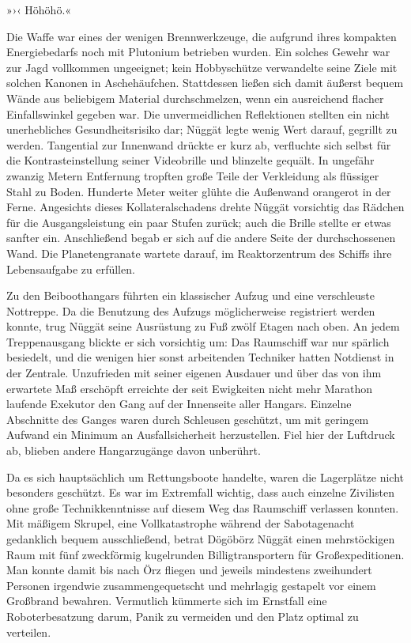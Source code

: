 »›‹ Höhöhö.«

Die Waffe war eines der wenigen Brennwerkzeuge, die aufgrund ihres kompakten Energiebedarfs noch mit Plutonium betrieben wurden. Ein solches Gewehr war zur Jagd vollkommen ungeeignet; kein Hobbyschütze verwandelte seine Ziele mit solchen Kanonen in Aschehäufchen. Stattdessen ließen sich damit äußerst bequem Wände aus beliebigem Material durchschmelzen, wenn ein ausreichend flacher Einfallswinkel gegeben war. Die unvermeidlichen Reflektionen stellten ein nicht unerhebliches Gesundheitsrisiko dar; Nüggät legte wenig Wert darauf, gegrillt zu werden. Tangential zur Innenwand drückte er kurz ab, verfluchte sich selbst für die Kontrasteinstellung seiner Videobrille und blinzelte gequält. In ungefähr zwanzig Metern Entfernung tropften große Teile der Verkleidung als flüssiger Stahl zu Boden. Hunderte Meter weiter glühte die Außenwand orangerot in der Ferne. Angesichts dieses Kollateralschadens drehte Nüggät vorsichtig das Rädchen für die Ausgangsleistung ein paar Stufen zurück; auch die Brille stellte er etwas sanfter ein. Anschließend begab er sich auf die andere Seite der durchschossenen Wand. Die Planetengranate wartete darauf, im Reaktorzentrum des Schiffs ihre Lebensaufgabe zu erfüllen.

Zu den Beiboothangars führten ein klassischer Aufzug und eine verschleuste Nottreppe. Da die Benutzung des Aufzugs möglicherweise registriert werden konnte, trug Nüggät seine Ausrüstung zu Fuß zwölf Etagen nach oben. An jedem Treppenausgang blickte er sich vorsichtig um: Das Raumschiff war nur spärlich besiedelt, und die wenigen hier sonst arbeitenden Techniker hatten Notdienst in der Zentrale. Unzufrieden mit seiner eigenen Ausdauer und über das von ihm erwartete Maß erschöpft erreichte der seit Ewigkeiten nicht mehr Marathon laufende Exekutor den Gang auf der Innenseite aller Hangars. Einzelne Abschnitte des Ganges waren durch Schleusen geschützt, um mit geringem Aufwand ein Minimum an Ausfallsicherheit herzustellen. Fiel hier der Luftdruck ab, blieben andere Hangarzugänge davon unberührt.

Da es sich hauptsächlich um Rettungsboote handelte, waren die Lagerplätze nicht besonders geschützt. Es war im Extremfall wichtig, dass auch einzelne Zivilisten ohne große Technikkenntnisse auf diesem Weg das Raumschiff verlassen konnten. Mit mäßigem Skrupel, eine Vollkatastrophe während der Sabotagenacht gedanklich bequem ausschließend, betrat Dögöbörz Nüggät einen mehrstöckigen Raum mit fünf zweckförmig kugelrunden Billigtransportern für Großexpeditionen. Man konnte damit bis nach Örz fliegen und jeweils mindestens zweihundert Personen irgendwie zusammengequetscht und mehrlagig gestapelt vor einem Großbrand bewahren. Vermutlich kümmerte sich im Ernstfall eine Roboterbesatzung darum, Panik zu vermeiden und den Platz optimal zu verteilen.

